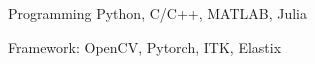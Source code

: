 
\vspace{-0.2cm}
\begin{cvskills}
  \cvskill
    {Programming} %
    {Python, C/C++, MATLAB, Julia} %
    

  \cvskill
    {Framework:} %
    {OpenCV, Pytorch, ITK, Elastix} %


\end{cvskills}
